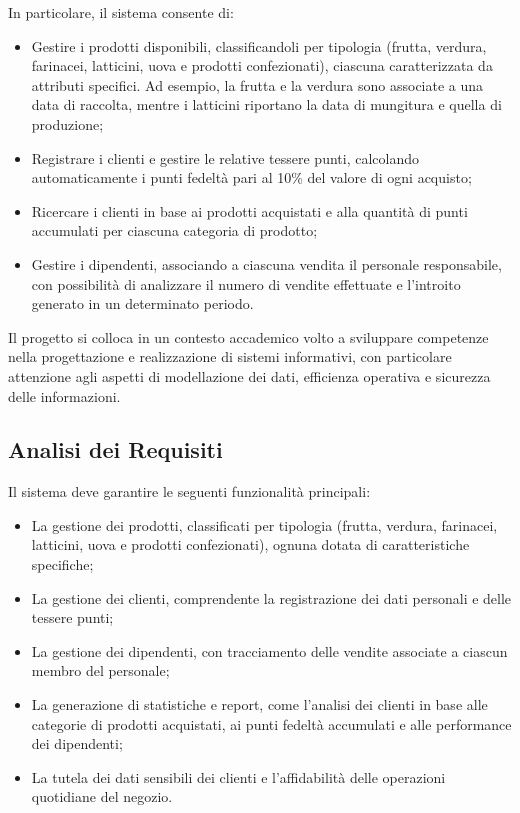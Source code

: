 \documentclass[a4paper,12pt]{article}
\begin{document}
In particolare, il sistema consente di:
\begin{itemize}
    \item Gestire i prodotti disponibili, classificandoli per tipologia (frutta, verdura, farinacei, latticini, uova e prodotti confezionati), ciascuna caratterizzata da attributi specifici. Ad esempio, la frutta e la verdura sono associate a una data di raccolta, mentre i latticini riportano la data di mungitura e quella di produzione;
    \item Registrare i clienti e gestire le relative tessere punti, calcolando automaticamente i punti fedeltà pari al 10\% del valore di ogni acquisto;
    \item Ricercare i clienti in base ai prodotti acquistati e alla quantità di punti accumulati per ciascuna categoria di prodotto;
    \item Gestire i dipendenti, associando a ciascuna vendita il personale responsabile, con possibilità di analizzare il numero di vendite effettuate e l’introito generato in un determinato periodo.
\end{itemize}

Il progetto si colloca in un contesto accademico volto a sviluppare competenze nella progettazione e realizzazione di sistemi informativi, con particolare attenzione agli aspetti di modellazione dei dati, efficienza operativa e sicurezza delle informazioni.

\newpage
\subsection{Analisi dei Requisiti}

Il sistema deve garantire le seguenti funzionalità principali:
\begin{itemize}
    \item La gestione dei prodotti, classificati per tipologia (frutta, verdura, farinacei, latticini, uova e prodotti confezionati), ognuna dotata di caratteristiche specifiche;
    \item La gestione dei clienti, comprendente la registrazione dei dati personali e delle tessere punti;
    \item La gestione dei dipendenti, con tracciamento delle vendite associate a ciascun membro del personale;
    \item La generazione di statistiche e report, come l’analisi dei clienti in base alle categorie di prodotti acquistati, ai punti fedeltà accumulati e alle performance dei dipendenti;
    \item La tutela dei dati sensibili dei clienti e l’affidabilità delle operazioni quotidiane del negozio.
\end{itemize}
\end{document}
